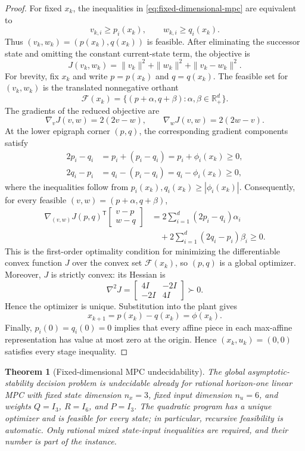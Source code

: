 \documentclass{IEEEtran}
\newtheorem{theorem}{Theorem}
\theoremstyle{remark}
\newcommand{\R}{\mathbb{R}}
\begin{document}
\begin{proof}
For fixed $x_k$, the inequalities in \eqref{eq:fixed-dimensional-mpc} are
equivalent to
\[
  v_{k,i}\ge p_i(x_k),\qquad w_{k,i}\ge q_i(x_k).
\]
Thus $(v_k,w_k)=(p(x_k),q(x_k))$ is feasible.  After eliminating the successor
state and omitting the constant current-state term, the objective is
\begin{equation*}
  J(v_k,w_k)=\|v_k\|^2+\|w_k\|^2+\|v_k-w_k\|^2.
\end{equation*}
For brevity, fix $x_k$ and write $p=p(x_k)$ and $q=q(x_k)$.  The feasible set
for $(v_k,w_k)$ is the translated nonnegative orthant
\[
  \mathcal F(x_k)=\{(p+\alpha,q+\beta):\alpha,\beta\in\R_+^d\}.
\]
The gradients of the reduced objective are
\[
  \nabla_v J(v,w)=2(2v-w),
  \qquad
  \nabla_w J(v,w)=2(2w-v).
\]
At the lower epigraph corner $(p,q)$, the corresponding gradient components
satisfy
\begin{align*}
  2p_i-q_i&=p_i+(p_i-q_i)=p_i+\phi_i(x_k)\ge0,\\
  2q_i-p_i&=q_i-(p_i-q_i)=q_i-\phi_i(x_k)\ge0,
\end{align*}
where the inequalities follow from
$p_i(x_k),q_i(x_k)\ge |\phi_i(x_k)|$.  Consequently, for every feasible
$(v,w)=(p+\alpha,q+\beta)$,
\begin{align*}
  \nabla_{(v,w)} J(p,q)^{\mathsf T}
  \begin{bmatrix}v-p\\w-q\end{bmatrix}
  &=2\sum_{i=1}^d(2p_i-q_i)\alpha_i\\
  &\quad+2\sum_{i=1}^d(2q_i-p_i)\beta_i
    \ge0.
\end{align*}
This is the first-order optimality condition for minimizing the differentiable
convex function $J$ over the convex set $\mathcal F(x_k)$, so $(p,q)$ is a
global optimizer.  Moreover, $J$ is strictly convex: its Hessian is
\[
  \nabla^2J=
  \begin{bmatrix}4I&-2I\\-2I&4I\end{bmatrix}\succ0.
\]
Hence the optimizer is unique.  Substitution into the plant gives
\[
  x_{k+1}=p(x_k)-q(x_k)=\phi(x_k).
\]
Finally, $p_i(0)=q_i(0)=0$ implies that every affine piece in each max-affine
representation has value at most zero at the origin.  Hence $(x_k,u_k)=(0,0)$
satisfies every stage inequality.
\end{proof}

\begin{theorem}[Fixed-dimensional MPC undecidability]
\label{thm:fixed-dimensional-mpc}
The global asymptotic-stability decision problem is undecidable already for
rational horizon-one linear MPC with fixed state dimension $n_x=3$, fixed input
dimension $n_u=6$, and weights $Q=I_3$, $R=I_6$, and $P=I_3$.  The quadratic
program has a unique optimizer and is feasible for every state; in particular,
recursive feasibility is automatic.  Only rational mixed state-input
inequalities are required, and their number is part of the instance.
\end{theorem}
\end{document}
